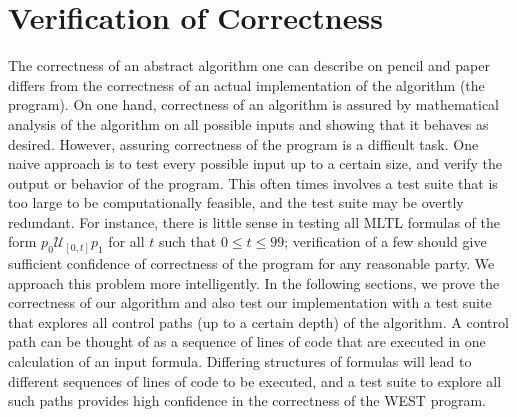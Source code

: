 \documentclass[runningheads]{llncs}
\begin{document}
\section{Verification of Correctness} \label{test}
 The correctness of an abstract algorithm one can describe on pencil and paper differs from the correctness of an actual implementation of the algorithm (the program). 
On one hand, correctness of an algorithm is assured by mathematical analysis of the algorithm on all possible inputs and showing that it behaves as desired. 
However, assuring correctness of the program is a difficult task.
One naive approach is to test every possible input up to a certain size, and verify the output or behavior of the program.
This often times involves a test suite that is too large to be computationally feasible, and the test suite may be overtly redundant. 
For instance, there is little sense in testing all MLTL formulas of the form $p_0 \mathcal{U}_{[0,t]} p_1$ for all $t$ such that $0 \leq t \leq 99$; verification of a few should give sufficient confidence of correctness of the program for any reasonable party. 
We approach this problem more intelligently. In the following sections, we prove the correctness of our algorithm and also test our implementation with a test suite that explores all control paths (up to a certain depth) of the algorithm. A control path can be thought of as a sequence of lines of code that are executed in one calculation of an input formula. Differing structures of formulas will lead to different sequences of lines of code to be executed, and a test suite to explore all such paths provides high confidence in the correctness of the WEST program.
\end{document}
